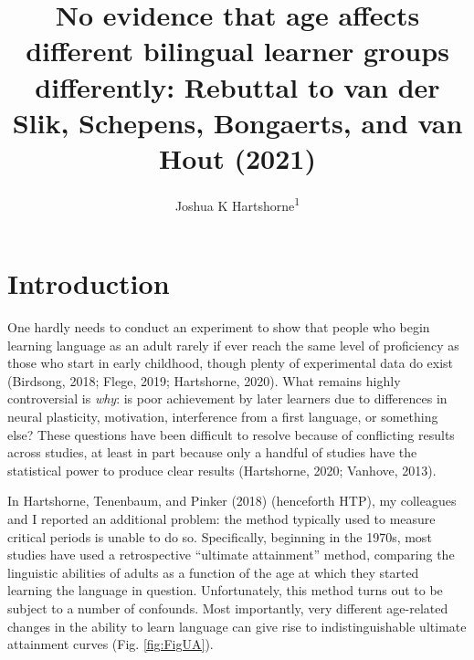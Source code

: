 \documentclass[
  english,
  doc,floatsintext]{apa6}
\title{No evidence that age affects different bilingual learner groups differently: Rebuttal to van der Slik, Schepens, Bongaerts, and van Hout (2021)}
\author{Joshua K Hartshorne\textsuperscript{1}}
\date{}
\affiliation{\vspace{0.5cm}\textsuperscript{1} Department of Psychology and Neuroscience, Boston College}
\begin{document}
\maketitle

\hypertarget{introduction}{%
\section{Introduction}\label{introduction}}

One hardly needs to conduct an experiment to show that people who begin learning language as an adult rarely if ever reach the same level of proficiency as those who start in early childhood, though plenty of experimental data do exist (Birdsong, 2018; Flege, 2019; Hartshorne, 2020). What remains highly controversial is \emph{why}: is poor achievement by later learners due to differences in neural plasticity, motivation, interference from a first language, or something else? These questions have been difficult to resolve because of conflicting results across studies, at least in part because only a handful of studies have the statistical power to produce clear results (Hartshorne, 2020; Vanhove, 2013).

In Hartshorne, Tenenbaum, and Pinker (2018) (henceforth HTP), my colleagues and I reported an additional problem: the method typically used to measure critical periods is unable to do so. Specifically, beginning in the 1970s, most studies have used a retrospective ``ultimate attainment'' method, comparing the linguistic abilities of adults as a function of the age at which they started learning the language in question. Unfortunately, this method turns out to be subject to a number of confounds. Most importantly, very different age-related changes in the ability to learn language can give rise to indistinguishable ultimate attainment curves (Fig. \ref{fig:FigUA}).
\end{document}
